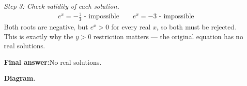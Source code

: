 \documentclass[11pt]{article}
\begin{document}
\textit{Step 3: Check validity of each solution.}
\[\begin{gathered}
e^x = -\frac{1}{3} \text{ - impossible} \qquad e^x = -3 \text{ - impossible}
\end{gathered}\]
Both roots are negative, but \( e^x > 0 \) for every real \( x \), so both must be rejected. This is exactly why the \( y > 0 \) restriction matters --- the original equation has no real solutions.

\begin{answerbox}
\textbf{Final answer:}\quad No real solutions.
\end{answerbox}
\textbf{Diagram.}

\begin{center}
\end{center}
\end{document}
